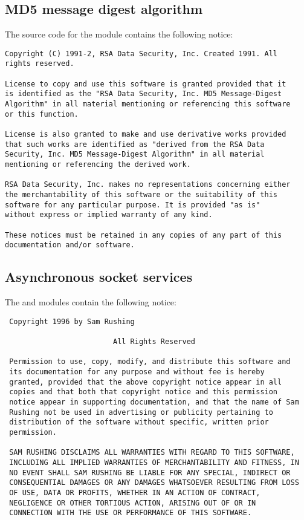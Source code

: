 \subsection{MD5 message digest algorithm}

The source code for the  module contains the following notice:

\begin{verbatim}
Copyright (C) 1991-2, RSA Data Security, Inc. Created 1991. All
rights reserved.

License to copy and use this software is granted provided that it
is identified as the "RSA Data Security, Inc. MD5 Message-Digest
Algorithm" in all material mentioning or referencing this software
or this function.

License is also granted to make and use derivative works provided
that such works are identified as "derived from the RSA Data
Security, Inc. MD5 Message-Digest Algorithm" in all material
mentioning or referencing the derived work.

RSA Data Security, Inc. makes no representations concerning either
the merchantability of this software or the suitability of this
software for any particular purpose. It is provided "as is"
without express or implied warranty of any kind.

These notices must be retained in any copies of any part of this
documentation and/or software.
\end{verbatim}



\subsection{Asynchronous socket services}

The  and  modules contain the
following notice:

\begin{verbatim}      
 Copyright 1996 by Sam Rushing

                         All Rights Reserved

 Permission to use, copy, modify, and distribute this software and
 its documentation for any purpose and without fee is hereby
 granted, provided that the above copyright notice appear in all
 copies and that both that copyright notice and this permission
 notice appear in supporting documentation, and that the name of Sam
 Rushing not be used in advertising or publicity pertaining to
 distribution of the software without specific, written prior
 permission.

 SAM RUSHING DISCLAIMS ALL WARRANTIES WITH REGARD TO THIS SOFTWARE,
 INCLUDING ALL IMPLIED WARRANTIES OF MERCHANTABILITY AND FITNESS, IN
 NO EVENT SHALL SAM RUSHING BE LIABLE FOR ANY SPECIAL, INDIRECT OR
 CONSEQUENTIAL DAMAGES OR ANY DAMAGES WHATSOEVER RESULTING FROM LOSS
 OF USE, DATA OR PROFITS, WHETHER IN AN ACTION OF CONTRACT,
 NEGLIGENCE OR OTHER TORTIOUS ACTION, ARISING OUT OF OR IN
 CONNECTION WITH THE USE OR PERFORMANCE OF THIS SOFTWARE.
\end{verbatim}



